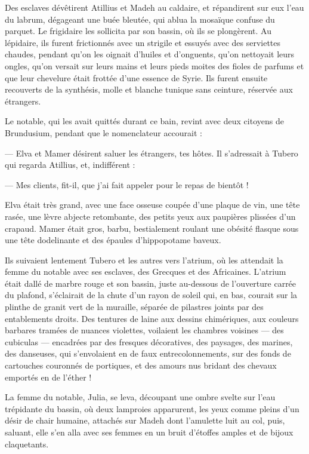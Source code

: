 \documentclass[a4paper, 11pt, oneside, polutonikogreek, french]{article}
\begin{document}
Des esclaves dévêtirent Atillius et Madeh au caldaire, et répandirent sur eux l'eau du labrum, dégageant une buée bleutée, qui ablua la mosaïque confuse du parquet. Le frigidaire les sollicita par son bassin, où ils se plongèrent. Au lépidaire, ils furent frictionnés avec un strigile et essuyés avec des serviettes chaudes, pendant qu'on les oignait d'huiles et d'onguents, qu'on nettoyait leurs ongles, qu'on versait sur leurs mains et leurs pieds moites des fioles de parfums et que leur chevelure était frottée d'une essence de Syrie. Ils furent ensuite recouverts de la synthésis, molle et blanche tunique sans ceinture, réservée aux étrangers.

Le notable, qui les avait quittés durant ce bain, revint avec deux citoyens de Brundusium, pendant que le nomenclateur accourait :

--- Elva et Mamer désirent saluer les étrangers, tes hôtes. Il s'adressait à Tubero qui regarda Atillius, et, indifférent :

--- Mes clients, fit-il, que j'ai fait appeler pour le repas de bientôt !

Elva était très grand, avec une face osseuse coupée d'une plaque de vin, une tête rasée, une lèvre abjecte retombante, des petits yeux aux paupières plissées d'un crapaud. Mamer était gros, barbu, bestialement roulant une obésité flasque sous une tête dodelinante et des épaules d'hippopotame baveux.

Ils suivaient lentement Tubero et les autres vers l'atrium, où les attendait la femme du notable avec ses esclaves, des Grecques et des Africaines. L'atrium était dallé de marbre rouge et son bassin, juste au-dessous de l'ouverture carrée du plafond, s'éclairait de la chute d'un rayon de soleil qui, en bas, courait sur la plinthe de granit vert de la muraille, séparée de pilastres joints par des entablements droits. Des tentures de laine aux dessins chimériques, aux couleurs barbares tramées de nuances violettes, voilaient les chambres voisines --- des cubiculas --- encadrées par des fresques décoratives, des paysages, des marines, des danseuses, qui s'envolaient en de faux entrecolonnements, sur des fonds de cartouches couronnés de portiques, et des amours nus bridant des chevaux emportés en de l'éther !

La femme du notable, Julia, se leva, découpant une ombre svelte sur l'eau trépidante du bassin, où deux lamproies apparurent, les yeux comme pleins d'un désir de chair humaine, attachés sur Madeh dont l'amulette luit au col, puis, saluant, elle s'en alla avec ses femmes en un bruit d'étoffes amples et de bijoux claquetants.
\end{document}

